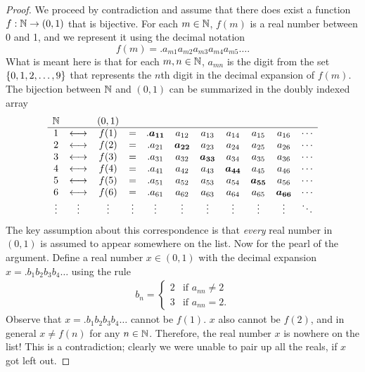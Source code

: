 \documentclass[11pt,twoside=off,numbers=noenddot]{scrbook}
\begin{document}
\begin{proof}
  We proceed by contradiction and assume that there does exist a
  function $f : \mathbb N \to (0, 1)$ that is bijective. For each $m \in
  \mathbb N$, $f(m)$ is a real number between 0 and 1, and we represent it
  using the decimal notation
  \[ f(m) = .a_{m1}a_{m2}a_{m3}a_{m4}a_{m5}\dots. \]
  What is meant here is that for each $m, n \in \mathbb N$, $a_{mn}$ is the
  digit from the set $\{ 0, 1, 2, \dots, 9 \}$ that represents the
  $n$th digit in the decimal expansion of $f(m)$. The bijection
  between $\mathbb N$ and $(0, 1)$ can be summarized in the doubly indexed array
  \begin{align*}
    \begin{array}{ccccccccccc}
      \mathbb N & & (0,1) & & & & & & & & \\
      \hline
      1 & \longleftrightarrow & f(1) & = & .\boldsymbol{a_{11}} &
      a_{12} & a_{13} & a_{14} & a_{15} & a_{16} & \cdots \\
      2 & \longleftrightarrow & f(2) & = & .a_{21} &
      \boldsymbol{a_{22}} & a_{23} & a_{24} & a_{25} & a_{26} & \cdots \\
      3 & \longleftrightarrow & f(3) & = & .a_{31} & a_{32} &
      \boldsymbol{a_{33}} & a_{34} & a_{35} & a_{36} & \cdots \\
      4 & \longleftrightarrow & f(4) & = & .a_{41} & a_{42} & a_{43}
      & \boldsymbol{a_{44}} & a_{45} & a_{46} & \cdots \\
      5 & \longleftrightarrow & f(5) & = & .a_{51} & a_{52} & a_{53}
      & a_{54} & \boldsymbol{a_{55}} & a_{56} & \cdots \\
      6 & \longleftrightarrow & f(6) & = & .a_{61} & a_{62} & a_{63}
      & a_{64} & a_{65} & \boldsymbol{a_{66}} & \cdots \\
      \vdots & \vdots & \vdots & \vdots & \vdots & \vdots & \vdots &
      \vdots & \vdots & \vdots & \ddots \\
    \end{array}
  \end{align*}
  The key assumption about this correspondence is that \textit{every}
  real number in $(0, 1)$ is assumed to appear somewhere on the list.
  Now for the pearl of the argument. Define a real number $x \in (0,
  1)$ with the decimal expansion $x = .b_1b_2b_3b_4\dots$ using the rule
  \begin{align*}
    b_n =
    \begin{cases}
      2 & \text{if $a_{nn} \neq 2$} \\
      3 & \text{if $a_{nn} = 2$}.
    \end{cases}
  \end{align*}
  Observe that $x = .b_1b_2b_3b_4\dots$ cannot be $f(1)$. $x$ also
  cannot be $f(2)$, and in general $x \neq f(n)$ for any $n \in \mathbb N$.
  Therefore, the real number $x$ is nowhere on the list! This is a
  contradiction; clearly we were unable to pair up all the reals, if
  $x$ got left out.
\end{proof}
\end{document}
